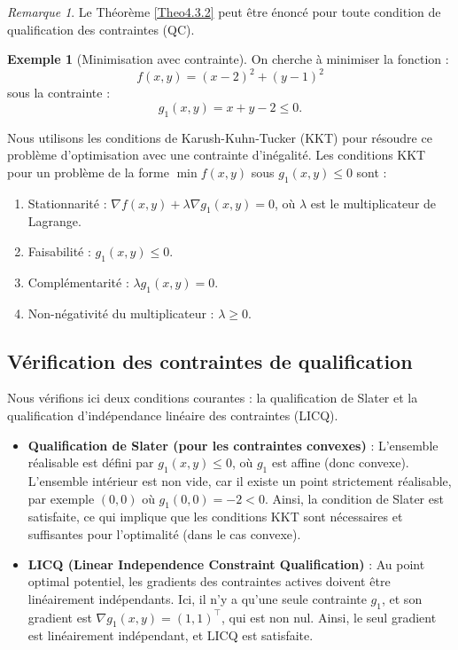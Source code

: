 \documentclass[a4paper,12pt,openany]{book}
\theoremstyle{plain}
\theoremstyle{definition}
\newtheorem{example}[theorem]{Exemple}
\theoremstyle{remark}
\newtheorem{remark}[theorem]{Remarque}
\theoremstyle{nbstyle}
\begin{document}
	\begin{remark}
		Le Théorème \ref{Theo4.3.2} peut être énoncé pour toute condition de qualification des contraintes (QC).
	\end{remark}
	\begin{example}[Minimisation avec contrainte]
	On cherche à minimiser la fonction :
	\[
	f(x, y) = (x - 2)^2 + (y - 1)^2
	\]
	sous la contrainte :
	\[
	g_1(x, y) = x + y - 2 \leq 0.
	\]
	
	Nous utilisons les conditions de Karush-Kuhn-Tucker (KKT) pour résoudre ce problème d'optimisation avec une contrainte d'inégalité. Les conditions KKT pour un problème de la forme \(\displaystyle\min f(x, y)\) sous \(g_1(x, y) \leq 0\) sont :
	\begin{enumerate}
		\item Stationnarité : \(\nabla f(x, y) + \lambda \nabla g_1(x, y) = 0\), où \(\lambda\) est le multiplicateur de Lagrange.
		\item Faisabilité : \(g_1(x, y) \leq 0\).
		\item Complémentarité : \(\lambda g_1(x, y) = 0\).
		\item Non-négativité du multiplicateur : \(\lambda \geq 0\).
	\end{enumerate}

	\subsection*{Vérification des contraintes de qualification}
	Nous vérifions ici deux conditions courantes : la qualification de Slater et la qualification d'indépendance linéaire des contraintes (LICQ).
	
	\begin{itemize}
		\item \textbf{Qualification de Slater (pour les contraintes convexes)} : L'ensemble réalisable est défini par \(g_1(x, y) \leq 0\), où \(g_1\) est affine (donc convexe). L'ensemble intérieur est non vide, car il existe un point strictement réalisable, par exemple \((0, 0)\) où \(g_1(0, 0) = -2 < 0\). Ainsi, la condition de Slater est satisfaite, ce qui implique que les conditions KKT sont nécessaires et suffisantes pour l'optimalité (dans le cas convexe).
		
		\item \textbf{LICQ (Linear Independence Constraint Qualification)} : Au point optimal potentiel, les gradients des contraintes actives doivent être linéairement indépendants. Ici, il n'y a qu'une seule contrainte \(g_1\), et son gradient est \(\nabla g_1(x, y) = (1, 1)^\top\), qui est non nul. Ainsi, le seul gradient est linéairement indépendant, et LICQ est satisfaite.
	\end{itemize}
	

\end{example}
\end{document}
